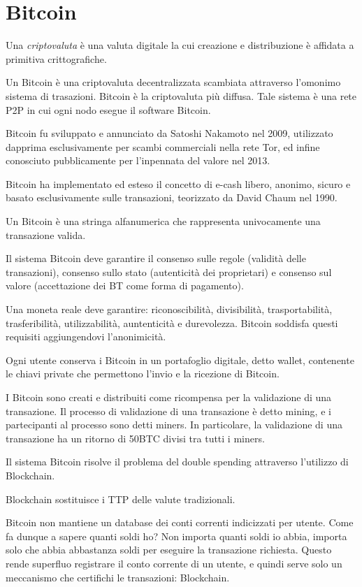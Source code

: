 \chapter{Bitcoin}
\label{chp:bitcoin}

Una \textit{criptovaluta} è una valuta digitale la cui creazione e distribuzione è affidata a primitiva crittografiche.

Un Bitcoin è una criptovaluta decentralizzata scambiata attraverso l'omonimo sistema di trasazioni. Bitcoin è la criptovaluta più diffusa. Tale sistema è una rete P2P in cui ogni nodo esegue il software Bitcoin.

Bitcoin fu sviluppato e annunciato da Satoshi Nakamoto nel 2009, utilizzato dapprima esclusivamente per scambi commerciali nella rete Tor, ed infine conosciuto pubblicamente per l'inpennata del valore nel 2013.

Bitcoin ha implementato ed esteso il concetto di e-cash libero, anonimo, sicuro e basato esclusivamente sulle transazioni, teorizzato da David Chaum nel 1990.

Un Bitcoin è una stringa alfanumerica che rappresenta univocamente una transazione valida.

Il sistema Bitcoin deve garantire il consenso sulle regole (validità delle transazioni), consenso sullo stato (autenticità dei proprietari) e consenso sul valore (accettazione dei BT come forma di pagamento).

Una moneta reale deve garantire: riconoscibilità, divisibilità, trasportabilità, trasferibilità, utilizzabilità, auntenticità e durevolezza.
Bitcoin soddisfa questi requisiti aggiungendovi l'anonimicità.

Ogni utente conserva i Bitcoin in un portafoglio digitale, detto wallet, contenente le chiavi private che permettono l'invio e la ricezione di Bitcoin.

I Bitcoin sono creati e distribuiti come ricompensa per la validazione di una transazione. Il processo di validazione di una transazione è detto mining, e i partecipanti al processo sono detti miners. In particolare, la validazione di una transazione ha un ritorno di 50BTC divisi tra tutti i miners.

Il sistema Bitcoin risolve il problema del double spending attraverso l'utilizzo di Blockchain.

Blockchain sostituisce i TTP delle valute tradizionali.

Bitcoin non mantiene un database dei conti correnti indicizzati per utente. Come fa dunque a sapere quanti soldi ho? Non importa quanti soldi io abbia, importa solo che abbia abbastanza soldi per eseguire la transazione richiesta.
Questo rende superfluo registrare il conto corrente di un utente, e quindi serve solo un meccanismo che certifichi le transazioni: Blockchain.

